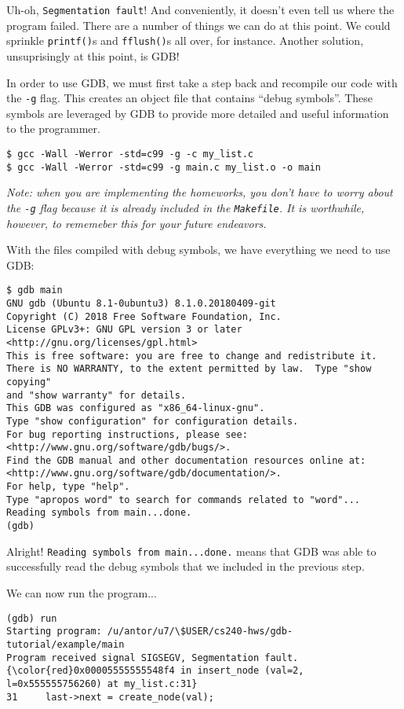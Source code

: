 \documentclass[11pt]{article}
\begin{document}
Uh-oh, {\tt Segmentation fault}! And conveniently, it doesn't even tell us
where the program failed. There are a number of things we can do at this
point. We could sprinkle {\tt printf()}s and {\tt fflush()}s all over, for
instance. Another solution, unsuprisingly at this point, is GDB!

In order to use GDB, we must first take a step back and recompile our code
with the {\tt -g} flag. This creates an object file that contains ``debug
symbols''. These symbols are leveraged by GDB to provide more detailed and
useful information to the programmer.

\begin{verbatim}
$ gcc -Wall -Werror -std=c99 -g -c my_list.c
$ gcc -Wall -Werror -std=c99 -g main.c my_list.o -o main
\end{verbatim}

\textit{Note: when you are implementing the homeworks, you don't have
to worry about the {\tt -g} flag because it is already included in the
{\tt Makefile}. It is worthwhile, however, to rememeber this for your
future endeavors.}

With the files compiled with debug symbols, we have everything we need
to use GDB:

\begin{verbatim}
$ gdb main
GNU gdb (Ubuntu 8.1-0ubuntu3) 8.1.0.20180409-git
Copyright (C) 2018 Free Software Foundation, Inc.
License GPLv3+: GNU GPL version 3 or later <http://gnu.org/licenses/gpl.html>
This is free software: you are free to change and redistribute it.
There is NO WARRANTY, to the extent permitted by law.  Type "show copying"
and "show warranty" for details.
This GDB was configured as "x86_64-linux-gnu".
Type "show configuration" for configuration details.
For bug reporting instructions, please see:
<http://www.gnu.org/software/gdb/bugs/>.
Find the GDB manual and other documentation resources online at:
<http://www.gnu.org/software/gdb/documentation/>.
For help, type "help".
Type "apropos word" to search for commands related to "word"...
Reading symbols from main...done.
(gdb) 
\end{verbatim}

Alright! {\tt Reading symbols from main...done.} means that GDB was able
to successfully read the debug symbols that we included in the previous
step.

\clearpage

We can now run the program...

\begin{Verbatim}[commandchars=\\\{\}]
(gdb) run
Starting program: /u/antor/u7/\$USER/cs240-hws/gdb-tutorial/example/main 
Program received signal SIGSEGV, Segmentation fault.
{\color{red}0x00005555555548f4 in insert_node (val=2, l=0x555555756260) at my_list.c:31}
31	   last->next = create_node(val);
\end{Verbatim}
\end{document}
